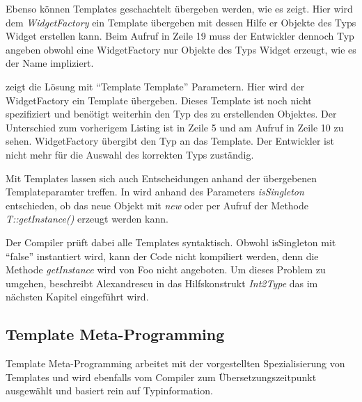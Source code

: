 

Ebenso können Templates geschachtelt übergeben werden, wie es  zeigt. Hier wird dem \emph{WidgetFactory} ein Template übergeben mit dessen Hilfe er Objekte des Typs Widget erstellen kann. Beim Aufruf in Zeile 19 muss der Entwickler dennoch Typ angeben obwohl eine WidgetFactory nur Objekte des Typs Widget erzeugt, wie es der Name impliziert.



 zeigt die Lösung mit ``Template Template'' Parametern. Hier wird der WidgetFactory ein Template übergeben. Dieses Template ist noch nicht spezifiziert und benötigt weiterhin den Typ des zu erstellenden Objektes. Der Unterschied zum vorherigem Listing ist in Zeile 5 und am Aufruf in Zeile 10 zu sehen. WidgetFactory übergibt den Typ an das Template. Der Entwickler ist nicht mehr für die Auswahl des korrekten Typs zuständig.



Mit Templates lassen sich auch Entscheidungen anhand der übergebenen Templateparamter treffen. In  wird anhand des Parameters \emph{isSingleton} entschieden, ob das neue Objekt mit \emph{new} oder per Aufruf der Methode \emph{T::getInstance()} erzeugt werden kann.



Der Compiler prüft dabei alle Templates syntaktisch. Obwohl isSingleton mit ``false'' instantiert wird, kann der Code nicht kompiliert werden, denn die Methode \emph{getInstance} wird von Foo nicht angeboten. Um dieses Problem zu umgehen, beschreibt Alexandrescu in \cite{Alexandrescu2001Modern} das Hilfskonstrukt \emph{Int2Type} das im nächsten Kapitel eingeführt wird.

\subsection{Template Meta-Programming}
Template Meta-Programming arbeitet mit der vorgestellten Spezialisierung von Templates und wird ebenfalls vom Compiler zum Übersetzungszeitpunkt ausgewählt und basiert rein auf Typinformation.

